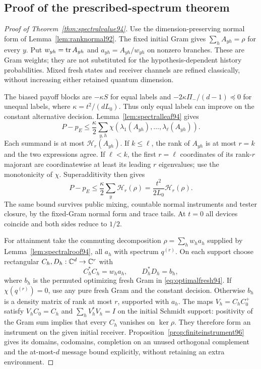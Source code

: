 \subsection{Proof of the prescribed-spectrum theorem}
\begin{proof}[Proof of Theorem~\ref{thm:spectralvalue94}]
Use the dimension-preserving normal form of
Lemma~\ref{lem:ranknormal92}.  The fixed initial Gram gives
$\sum_hA_{yh}=\rho$ for every $y$.  Put $w_{yh}=\operatorname{tr} A_{yh}$ and
$a_{yh}=A_{yh}/w_{yh}$ on nonzero branches.  These are Gram weights;
they are not substituted for the hypothesis-dependent history
probabilities.  Mixed fresh states and receiver channels are refined
classically, without increasing either retained quantum dimension.

The biased payoff blocks are $-\kappa S$ for equal labels and
$-2\kappa\Pi_-/(d-1)\preceq0$ for unequal labels, where
$\kappa=t^2/(dL_0)$.  Thus only equal labels can improve on the
constant alternative decision.  Lemma~\ref{lem:spectralleaf94} gives
\[
 P-p_E\le\frac{\kappa}{2}\sum_{y,h}
                  \chi(\lambda_1(A_{yh}),\ldots,\lambda_\ell(A_{yh})).
\]
Each summand is at most $\mathcal H_r(A_{yh})$.  If $k\le\ell$, the
rank of $A_{yh}$ is at most $r=k$ and the two expressions agree.  If
$\ell<k$, the first $r=\ell$ coordinates of its rank-$r$ majorant
are coordinatewise at least its leading $r$ eigenvalues; use the
monotonicity of $\chi$.  Superadditivity then gives
\[
 P-p_E\le\frac{\kappa}{2}\sum_y\mathcal H_r(\rho)
                    =\frac{t^2}{2L_0}\mathcal H_r(\rho).
\]
The same bound survives public mixing, countable normal instruments
and tester closure, by the fixed-Gram normal form and trace tails.
At $t=0$ all devices coincide and both sides reduce to $1/2$.

For attainment take the commuting decomposition
$\rho=\sum_hw_ha_h$ supplied by Lemma~\ref{lem:spectralroof94}, all
$a_h$ with spectrum $q^{(r)}$.  On each support choose rectangular
$C_h,D_h:\mathbb C^d\to\mathbb C^r$ with
\[
 C_h^*C_h=w_ha_h,\qquad D_h^*D_h=b_h,
\]
where $b_h$ is the permuted optimizing fresh Gram in
\eqref{eq:optimalfresh94}.  If $\chi(q^{(r)})=0$, use any pure
fresh Gram and the constant decision.  Otherwise $b_h$ is a density
matrix of rank at most $r$, supported with $a_h$.  The maps
$V_h=C_hC_0^+$ satisfy $V_hC_0=C_h$ and
$\sum_hV_h^*V_h=I$ on the initial Schmidt support: positivity of the
Gram sum implies that every $C_h$ vanishes on $\ker\rho$.
They therefore form an instrument on the given initial receiver.
Proposition~\ref{prop:finiteinstrument96} gives its domains, codomains,
completion on an unused orthogonal complement and the at-most-$d$
message bound explicitly, without retaining an extra environment.


\end{proof}
